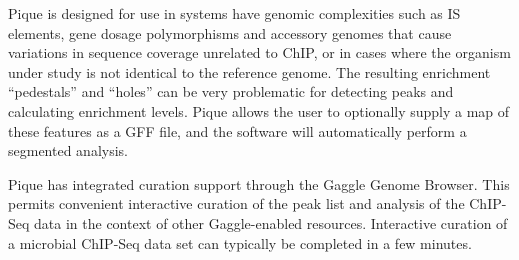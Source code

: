 \documentclass{bioinfo}
\begin{document}
Pique is designed for use in systems have genomic complexities such as
IS elements, gene dosage polymorphisms and accessory genomes that
cause variations in sequence coverage unrelated to ChIP, or in cases
where the organism under study is not identical to the reference
genome. The resulting enrichment ``pedestals'' and ``holes'' can be
very problematic for detecting peaks and calculating enrichment
levels. Pique allows the user to optionally supply a map of these
features as a GFF file, and the software will automatically perform a
segmented analysis.

Pique has integrated curation support through the Gaggle Genome
Browser. This permits convenient interactive curation of the peak list
and analysis of the ChIP-Seq data in the context of other
Gaggle-enabled resources. Interactive curation of a microbial ChIP-Seq
data set can typically be completed in a few minutes.
\end{document}
